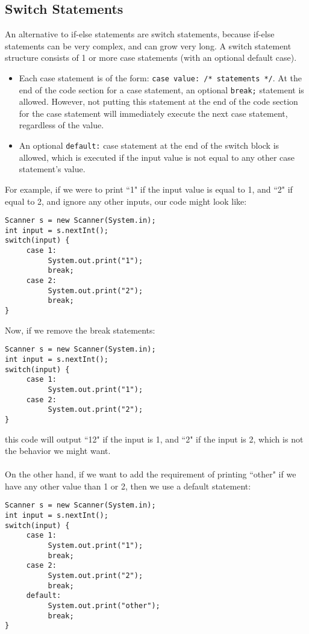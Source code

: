 \subsection{Switch Statements}
An alternative to if-else statements are switch statements, because if-else statements can be very complex, and can grow very long. A switch statement structure consists of 1 or more case statements (with an optional default case).
\begin{itemize}
\item Each case statement is of the form: \verb|case value: /* statements */|. At the end of the code section for a case statement, an optional \verb|break;| statement is allowed. However, not putting this statement at the end of the code section for the case statement will immediately execute the next case statement, regardless of the value.
\item An optional \verb|default:| case statement at the end of the switch block is allowed, which is executed if the input value is not equal to any other case statement's value.
\end{itemize}
For example, if we were to print ``1" if the input value is equal to 1, and ``2" if equal to 2, and ignore any other inputs, our code might look like:
\begin{lstlisting}
Scanner s = new Scanner(System.in);
int input = s.nextInt();
switch(input) {
     case 1:
          System.out.print("1");
          break;
     case 2:
          System.out.print("2");
          break;
}
\end{lstlisting}
Now, if we remove the break statements:
\begin{lstlisting}
Scanner s = new Scanner(System.in);
int input = s.nextInt();
switch(input) {
     case 1:
          System.out.print("1");
     case 2:
          System.out.print("2");
}
\end{lstlisting}
this code will output ``12" if the input is 1, and ``2" if the input is 2, which is not the behavior we might want.
\\ \\
On the other hand, if we want to add the requirement of printing ``other" if we have any other value than 1 or 2, then we use a default statement:
\begin{lstlisting}
Scanner s = new Scanner(System.in);
int input = s.nextInt();
switch(input) {
     case 1:
          System.out.print("1");
          break;
     case 2:
          System.out.print("2");
          break;
     default:
          System.out.print("other");
          break;
}
\end{lstlisting}
